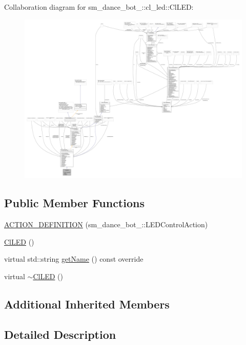 Collaboration diagram for sm\+\_\+dance\+\_\+bot\+\_\+:\+:cl\+\_\+led\+:\+:Cl\+L\+ED\+:
\nopagebreak
\begin{figure}[H]
\begin{center}
\leavevmode
\includegraphics[width=350pt]{classsm__dance__bot__3_1_1cl__led_1_1ClLED__coll__graph}
\end{center}
\end{figure}
\subsection*{Public Member Functions}
\begin{DoxyCompactItemize}
\item 
\hyperlink{classsm__dance__bot__3_1_1cl__led_1_1ClLED_a22eed70ddbce96a6207062fdb635f719}{A\+C\+T\+I\+O\+N\+\_\+\+D\+E\+F\+I\+N\+I\+T\+I\+ON} (sm\+\_\+dance\+\_\+bot\+\_\+::\+L\+E\+D\+Control\+Action)
\item 
\hyperlink{classsm__dance__bot__3_1_1cl__led_1_1ClLED_ae723d91532a1a059f5ec716a9706a445}{Cl\+L\+ED} ()
\item 
virtual std\+::string \hyperlink{classsm__dance__bot__3_1_1cl__led_1_1ClLED_a18bff383986af7ae46ed498abca66bda}{get\+Name} () const override
\item 
virtual \hyperlink{classsm__dance__bot__3_1_1cl__led_1_1ClLED_a554d05dd7c158e5221a2122c5f183cc6}{$\sim$\+Cl\+L\+ED} ()
\end{DoxyCompactItemize}
\subsection*{Additional Inherited Members}


\subsection{Detailed Description}


